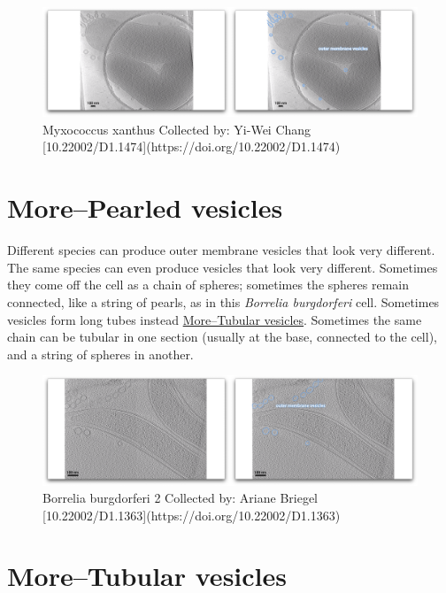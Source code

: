 \documentclass[]{tufte-book}
\begin{document}
\begin{figure}
\includegraphics{movie_stills/2_4} \caption[Myxococcus xanthus Collected by]{Myxococcus xanthus Collected by: Yi-Wei Chang [10.22002/D1.1474](https://doi.org/10.22002/D1.1474)}\label{fig:unnamed-chunk-27}
\end{figure}

\section{More--Pearled vesicles}\label{morepearled-vesicles}

Different species can produce outer membrane vesicles that look very
different. The same species can even produce vesicles that look very
different. Sometimes they come off the cell as a chain of spheres;
sometimes the spheres remain connected, like a string of pearls, as in
this \emph{Borrelia burgdorferi} cell. Sometimes vesicles form long
tubes instead \protect\hyperlink{moretubular-vesicles}{More--Tubular
vesicles}. Sometimes the same chain can be tubular in one section
(usually at the base, connected to the cell), and a string of spheres in
another.

\begin{figure}
\includegraphics{movie_stills/2_4a} \caption[Borrelia burgdorferi 2 Collected by]{Borrelia burgdorferi 2 Collected by: Ariane Briegel [10.22002/D1.1363](https://doi.org/10.22002/D1.1363)}\label{fig:unnamed-chunk-28}
\end{figure}

\hypertarget{moretubular-vesicles}{\section{More--Tubular
vesicles}\label{moretubular-vesicles}}
\end{document}
